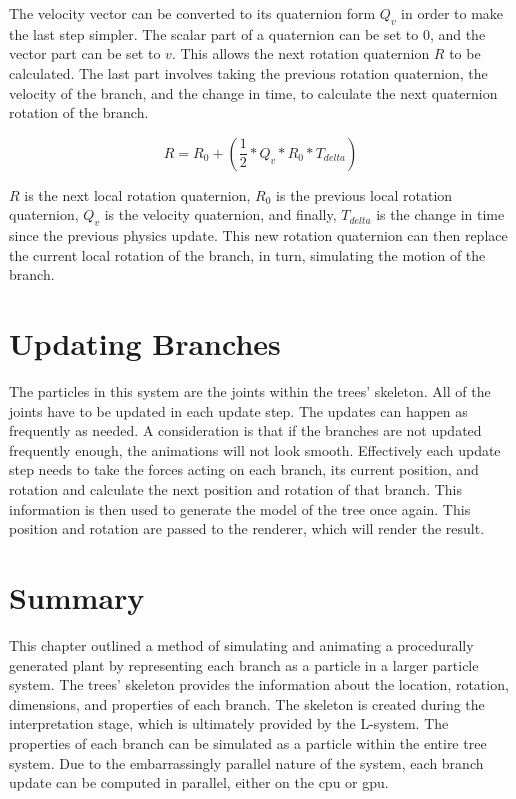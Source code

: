 \noindent
The velocity vector can be converted to its quaternion form $Q_v$ in order to make the last step simpler. The scalar part of a quaternion can be set to 0, and the vector part can be set to $v$. This allows the next rotation quaternion $R$ to be calculated. The last part involves taking the previous rotation quaternion, the velocity of the branch, and the change in time, to calculate the next quaternion rotation of the branch.

\begin{equation}
R = R_0 + (\frac{1}{2} * Q_v * R_0 * T_{delta})
\end{equation}

\noindent
$R$ is the next local rotation quaternion, $R_0$ is the previous local rotation quaternion, $Q_v$ is the velocity quaternion, and finally, $T_{delta}$ is the change in time since the previous physics update. This new rotation quaternion can then replace the current local rotation of the branch, in turn, simulating the motion of the branch.

\section{Updating Branches}

The particles in this system are the joints within the trees' skeleton. All of the joints have to be updated in each update step. The updates can happen as frequently as needed. A consideration is that if the branches are not updated frequently enough, the animations will not look smooth. Effectively each update step needs to take the forces acting on each branch, its current position, and rotation and calculate the next position and rotation of that branch. This information is then used to generate the model of the tree once again. This position and rotation are passed to the renderer, which will render the result.

\section{Summary}

This chapter outlined a method of simulating and animating a procedurally generated plant by representing each branch as a  particle in a larger particle system. The trees' skeleton provides the information about the location, rotation, dimensions, and properties of each branch. The skeleton is created during the interpretation stage, which is ultimately provided by the L-system. The properties of each branch can be simulated as a particle within the entire tree system. Due to the embarrassingly parallel nature of the system, each branch update can be computed in parallel, either on the \acrshort{cpu} or \acrshort{gpu}.    

